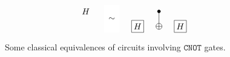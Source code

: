 \documentclass[a4paper,12pt,fleqn]{article}
\newcommand\cnot{\mathtt{CNOT}}
\begin{document}
\begin{figure}
\begin{equation}
{\begin{tikzpicture}[scale=1.200000,x=1pt,y=1pt]
\begin{scope}
\clip (99.000000, 15.000000) +(-45.000000:8.485281pt and 8.485281pt) -- +(45.000000:8.485281pt and 8.485281pt) -- +(135.000000:8.485281pt and 8.485281pt) -- +(225.000000:8.485281pt and 8.485281pt) -- cycle;
\draw (99.000000, 15.000000) node {$H$};
\end{scope}
\draw[fill=white,color=white] (117.000000, -6.000000) rectangle (132.000000, 21.000000);
\draw (124.500000, 7.500000) node {$\sim$};
\begin{scope}
\draw[fill=white] (150.000000, -0.000000) +(-45.000000:8.485281pt and 8.485281pt) -- +(45.000000:8.485281pt and 8.485281pt) -- +(135.000000:8.485281pt and 8.485281pt) -- +(225.000000:8.485281pt and 8.485281pt) -- cycle;
\clip (150.000000, -0.000000) +(-45.000000:8.485281pt and 8.485281pt) -- +(45.000000:8.485281pt and 8.485281pt) -- +(135.000000:8.485281pt and 8.485281pt) -- +(225.000000:8.485281pt and 8.485281pt) -- cycle;
\draw (150.000000, -0.000000) node {$H$};
\end{scope}
\draw (171.000000,15.000000) -- (171.000000,0.000000);
\begin{scope}
\draw[fill=white] (171.000000, 0.000000) circle(3.000000pt);
\clip (171.000000, 0.000000) circle(3.000000pt);
\draw (168.000000, 0.000000) -- (174.000000, 0.000000);
\draw (171.000000, -3.000000) -- (171.000000, 3.000000);
\end{scope}
\filldraw (171.000000, 15.000000) circle(1.500000pt);
\begin{scope}
\draw[fill=white] (192.000000, -0.000000) +(-45.000000:8.485281pt and 8.485281pt) -- +(45.000000:8.485281pt and 8.485281pt) -- +(135.000000:8.485281pt and 8.485281pt) -- +(225.000000:8.485281pt and 8.485281pt) -- cycle;
\clip (192.000000, -0.000000) +(-45.000000:8.485281pt and 8.485281pt) -- +(45.000000:8.485281pt and 8.485281pt) -- +(135.000000:8.485281pt and 8.485281pt) -- +(225.000000:8.485281pt and 8.485281pt) -- cycle;
\draw (192.000000, -0.000000) node {$H$};
\end{scope}
\end{tikzpicture}
    }
\end{equation}

{ \caption{ Some classical equivalences of circuits involving $\cnot$ gates.\label{equi}}}
\end{figure}
\medskip
\end{document}
